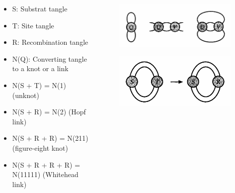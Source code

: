 \begin{frame}
\begin{columns}[T]
\begin{column}{.48\textwidth}
\begin{itemize}
\item S: Substrat tangle
\item T: Site tangle
\item R: Recombination tangle
\item N(Q): Converting tangle to a knot or a link
\item N(S + T) = N(1) (unknot)
\item N(S + R) = N(2) (Hopf link)
\item N(S + R + R) = N(211) (figure-eight knot)
\item N(S + R + R + R) = N(11111) (Whitehead link)
\end{itemize}
\end{column}
\begin{column}{.48\textwidth}
\begin{figure}
    \centering
    \includegraphics[width=1\linewidth]{images/subtang.png}
    \label{subtang}
    \cite{adams2004knot}
\end{figure}
\begin{figure}
    \centering
    \includegraphics[width=0.75\linewidth]{images/substrat.png}
    \label{substrat}
    \cite{adams2004knot}
\end{figure}
\end{column}
\end{columns}
\end{frame}

